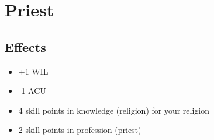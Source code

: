 \section{Priest}\label{background:priest}

\subsection{Effects}
\begin{itemize}
    \item +1 WIL
    \item -1 ACU
    \item 4 skill points in knowledge (religion) for your religion
    \item 2 skill points in profession (priest)
\end{itemize}
